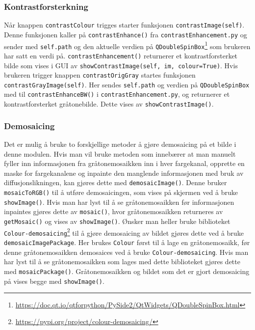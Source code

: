 \subsubsection{Kontrastforsterkning}
Når knappen \texttt{contrastColour} trigges starter funksjonen \texttt{contrastImage(self)}. Denne funksjonen kaller på \texttt{contrastEnhance()} fra \texttt{contrastEnhancement.py} og sender med \texttt{self.path} og den aktuelle verdien på \texttt{QDoubleSpinBox}\footnote{\url{https://doc.qt.io/qtforpython/PySide2/QtWidgets/QDoubleSpinBox.html}} som brukeren har satt en verdi på. \texttt{contrastEnhancement()} returnerer et kontrastforsterket bilde som vises i GUI av \texttt{showContrastImage(self, im, colour=True)}. Hvis brukeren trigger knappen \texttt{contrastOrigGray} startes funksjonen \texttt{contrastGrayImage(self)}. Her sendes \texttt{self.path} og verdien på \texttt{QDoubleSpinBox} med til \texttt{contrastEnhanceBW()} i \texttt{contrastEnhancement.py}, og returnerer et kontrastforsterket gråtonebilde. Dette vises av \texttt{showContrastImage()}.

\subsubsection{Demosaicing}
Det er mulig å bruke to forskjellige metoder å gjøre demosaicing på et bilde i denne modulen. Hvis man vil bruke metoden som innebærer at man manuelt fyller inn informasjonen fra gråtonemosaikken inn i hver fargekanal, opprette en maske for fargekanalene og inpainte den manglende informasjonen med bruk av diffusjonslikningen, kan gjøres dette med \texttt{demosaicImage()}. Denne bruker \texttt{mosaicToRGB()} til å utføre demosaicingen, som vises på skjermen ved å bruke \texttt{showImage()}. Hvis man har lyst til å se gråtonemosaikken før informasjonen inpaintes gjøres dette av \texttt{mosaic()}, hvor gråtonemosaikken returneres av \texttt{getMosaic()} og vises av \texttt{showImage()}. Ønsker man heller bruke biblioteket \texttt{Colour-demosaicing}\footnote{\url{https://pypi.org/project/colour-demosaicing/}} til å gjøre demosaicing av bildet gjøres dette ved å bruke \texttt{demosaicImagePackage}. Her brukes \texttt{Colour} først til å lage en gråtonemosaikk, før denne gråtonemosaikken demosaices ved å bruke \texttt{Colour-demosaicing}. Hvis man har lyst til å se gråtonemosaikken som lages med dette biblioteket gjøres dette med \texttt{mosaicPackage()}. Gråtonemosaikken og bildet som det er gjort demosaicing på vises begge med \texttt{showImage()}. 

